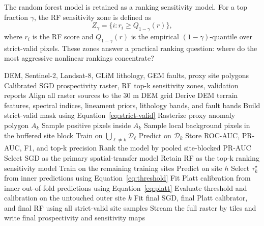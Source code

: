 \documentclass[numrefs]{interact}
\theoremstyle{plain}%
\theoremstyle{definition}
\theoremstyle{remark}
\begin{document}
The random forest model is retained as a ranking sensitivity model. For a top fraction \(\gamma\), the RF sensitivity zone is defined as
\begin{equation}
    Z_{\gamma}
    =
    \{i:r_i\ge Q_{1-\gamma}(r)\},
    \label{eq:topk}
\end{equation}
where \(r_i\) is the RF score and \(Q_{1-\gamma}(r)\) is the empirical \((1-\gamma)\)-quantile over strict-valid pixels. These zones answer a practical ranking question: where do the most aggressive nonlinear rankings concentrate?

\begin{algorithm}[H]
\caption{Leakage-aware prospectivity workflow}
\label{alg:workflow}
\begin{algorithmic}[1]
\Require DEM, Sentinel-2, Landsat-8, GLiM lithology, GEM faults, proxy site polygons
\Ensure Calibrated SGD prospectivity raster, RF top-k sensitivity zones, validation reports
\State Align all raster sources to the 30 m DEM grid
\State Derive DEM terrain features, spectral indices, lineament priors, lithology bands, and fault bands
\State Build strict-valid mask using Equation~\ref{eq:strict-valid}
    \State Rasterize proxy anomaly polygon \(A_k\)
    \State Sample positive pixels inside \(A_k\)
    \State Sample local background pixels in the buffered site block
\EndFor
{}
        \State Train on \(\bigcup_{\ell\ne k}\mathcal{D}_{\ell}\)
        \State Predict on \(\mathcal{D}_{k}\)
        \State Store ROC-AUC, PR-AUC, F1, and top-k precision
    \EndFor
    \State Rank the model by pooled site-blocked PR-AUC
\EndFor
\State Select SGD as the primary spatial-transfer model
\State Retain RF as the top-k ranking sensitivity model
        \State Train on the remaining training sites
        \State Predict on site \(h\)
    \EndFor
    \State Select \(\tau_k^\star\) from inner predictions using Equation~\ref{eq:threshold}
    \State Fit Platt calibration from inner out-of-fold predictions using Equation~\ref{eq:platt}
    \State Evaluate threshold and calibration on the untouched outer site \(k\)
\EndFor
\State Fit final SGD, final Platt calibrator, and final RF using all strict-valid site samples
\State Stream the full raster by tiles and write final prospectivity and sensitivity maps
\end{algorithmic}
\end{algorithm}
\end{document}
